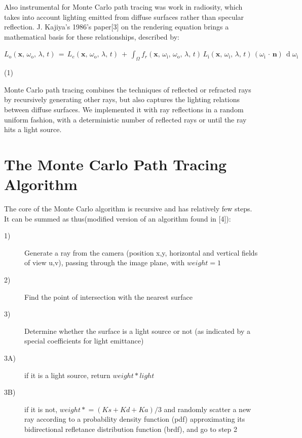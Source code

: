 \documentclass[journal]{IEEEtran}
\begin{document}
\par

Also instrumental for Monte Carlo path tracing was work in radiosity, which takes into account lighting emitted from diffuse surfaces rather than specular reflection. J. Kajiya's 1986's paper[3] on the rendering equation brings a mathematical basis for these relationships, described by:

\begin{center}
$L_{\text{o}}(\mathbf x,\, \omega_{\text{o}},\, \lambda,\, t) \,=\, L_e(\mathbf x,\, \omega_{\text{o}},\, \lambda,\, t) \ +\, \int_\Omega f_r(\mathbf x,\, \omega_{\text{i}},\, \omega_{\text{o}},\, \lambda,\, t)\, L_{\text{i}}(\mathbf x,\, \omega_{\text{i}},\, \lambda,\, t)\, (\omega_{\text{i}}\,\cdot\,\mathbf n)\, \operatorname d \omega_{\text{i}}$
\end{center}

\begin{flushright}
\par 
(1)
\end{flushright}

\par
Monte Carlo path tracing combines the techniques of reflected or refracted rays by recursively generating other rays, but also captures the lighting relations between diffuse surfaces. We implemented it with ray reflections in a random uniform fashion, with a deterministic number of reflected rays or until the ray hits a light source.

\section{The Monte Carlo Path Tracing Algorithm}
The core of the Monte Carlo algorithm is recursive and has relatively few steps. It can be summed as thus(modified version of an algorithm found in [4]):

\begin{description}
  \item[1)] Generate a ray from the camera (position x,y, horizontal and vertical fields of view u,v), passing through the image plane, with $weight = 1$
  \item[2)] Find the point of intersection with the nearest surface
  \item[3)] Determine whether the surface is a light source or not (as indicated by a special coefficients for light emittance)
  \item[3A)] if it is a light source, return $weight * light$
  \item[3B)] if it is not, $weight \mathrel{*}= (Ks+Kd+Ka)/3$ and randomly scatter a new ray according to a probability density function (pdf) approximating its bidirectional refletance distribution function (brdf), and go to step 2
\end{description}
\end{document}

